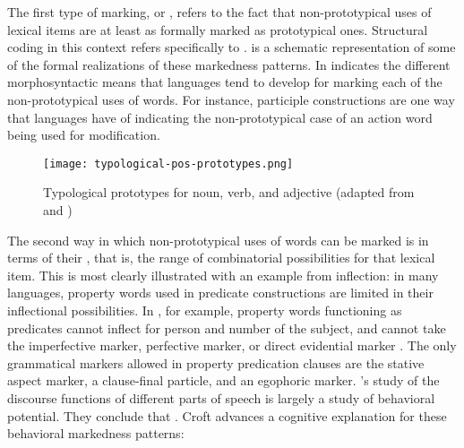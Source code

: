 The first type of marking,  or , refers to the fact that non-prototypical uses of lexical items are at least as formally marked as prototypical ones. Structural coding in this context refers specifically to .  is a schematic representation of some of the formal realizations of these markedness patterns. In indicates the different morphosyntactic means that languages tend to develop for marking each of the non-prototypical uses of words. For instance, participle constructions are one way that languages have of indicating the non-prototypical case of an action word being used for modification.

\begin{figure}[h!]
  \centering
  \texttt{[image: typological-pos-prototypes.png]}
  \caption[Typological prototypes for noun, verb, and adjective]{Typological prototypes for noun, verb, and adjective (adapted from \textcite[89]{Croft2000} and \textcite[62]{Lier2012})}
  \label{fig:typological-pos-prototypes}
\end{figure}

The second way in which non-prototypical uses of words can be marked is in terms of their , that is, the range of combinatorial possibilities for that lexical item. This is most clearly illustrated with an example from inflection: in many languages, property words used in predicate constructions are limited in their inflectional possibilities. In , for example, property words functioning as predicates cannot inflect for person and number of the subject, and cannot take the imperfective marker, perfective marker, or direct evidential marker \parencite[96--97]{Bai2019}. The only grammatical markers allowed in property predication clauses are the stative aspect marker, a clause-final particle, and an egophoric marker. \citeauthor{HopperThompson1984}'s \parencite*{HopperThompson1984} study of the discourse functions of different parts of speech is largely a study of behavioral potential. They conclude that . Croft advances a cognitive explanation for these behavioral markedness patterns:

